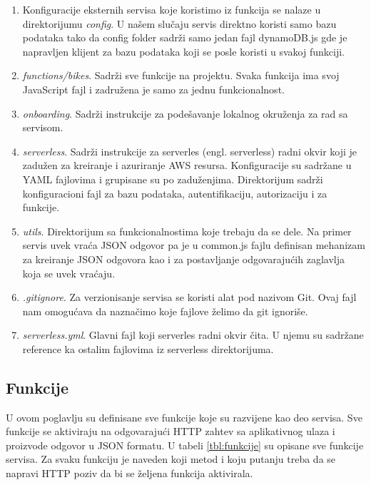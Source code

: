 \documentclass[12pt,oneside]{memoir}
\begin{document}
\begin{enumerate}
  \item Konfiguracije eksternih servisa koje koristimo iz funkcija se nalaze u direktorijumu \emph{config}. U našem slučaju servis direktno koristi samo bazu podataka tako da config folder sadrži samo jedan fajl dynamoDB.js gde je napravljen klijent za bazu podataka koji se posle koristi u svakoj funkciji.
  \item \emph{functions/bikes}. Sadrži sve funkcije na projektu. Svaka funkcija ima svoj JavaScript fajl i zadružena je samo za jednu funkcionalnost. 
  \item \emph{onboarding}. Sadrži instrukcije za podešavanje lokalnog okruženja za rad sa servisom.
  \item \emph{serverless}. Sadrži instrukcije za serverles (engl. serverless) radni okvir koji je zadužen za kreiranje i azuriranje AWS resursa. Konfiguracije su sadržane u YAML fajlovima i grupisane su po zaduženjima. Direktorijum sadrži konfiguracioni fajl za bazu podataka, autentifikaciju, autorizaciju i za funkcije.
  \item \emph{utils}. Direktorijum sa funkcionalnostima koje trebaju da se dele. Na primer servis uvek vraća JSON odgovor pa je u common.js fajlu definisan mehanizam za kreiranje JSON odgovora kao i za postavljanje odgovarajućih zaglavlja koja se uvek vraćaju.
  \item \emph{.gitignore}. Za verzionisanje servisa se koristi alat pod nazivom Git. Ovaj fajl nam omogućava da naznačimo koje fajlove želimo da git ignoriše.
  \item \emph{serverless.yml}. Glavni fajl koji serverles radni okvir čita. U njemu su sadržane reference ka ostalim fajlovima iz serverless direktorijuma.
\end{enumerate}

\subsection{Funkcije}
U ovom poglavlju su definisane sve funkcije koje su razvijene kao deo servisa. Sve funkcije se aktiviraju na odgovarajući HTTP zahtev sa aplikativnog ulaza i proizvode odgovor u JSON formatu. U tabeli \ref{tbl:funkcije} su opisane sve funkcije servisa. Za svaku funkciju je naveden koji metod i koju putanju treba da se napravi HTTP poziv da bi se željena funkcija aktivirala.
\end{document}
